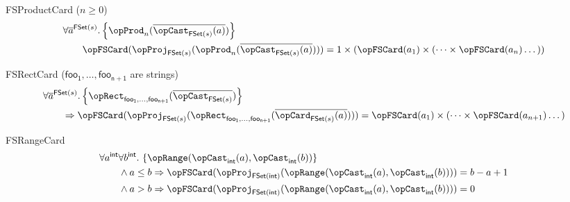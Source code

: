 \documentclass[11pt, a4paper, oneside]{article}
\begin{document}
\begin{axioms}
%

\item[FSProductCard ($n \ge 0$)] \[
        \begin{aligned}
            &\forall \overline{a}^{\FSet(s)}. \st{ \opProd_n(\overline{\opCast_{\FSet(s)}(a)}) } \\
            &\qquad \opFSCard(\opProj_{\FSet(s)}(\opProd_n(\overline{\opCast_{\FSet(s)}(a)}))) = 1 \times (\opFSCard(a_1) \times (\dots \times \opFSCard(a_n) \dots))
        \end{aligned}
    \]

\item[FSRectCard (\rm$\mathsf{foo_1},\dots,\mathsf{foo_{n+1}}$ are strings)] \[
        \begin{aligned}
            &\forall \overline{a}^{\FSet(s)}. \st{ \opRect_{\mathsf{foo_1}, \dots, \mathsf{foo_{n+1}}}(\overline{\opCast_{\FSet(s)}}) } \\
            &\qquad \imp \opFSCard(\opProj_{\FSet(s)}(\opRect_{\mathsf{foo_1}, \dots, \mathsf{foo_{n+1}}}(\overline{\opCard_{\FSet(s)}(a)}))) = \opFSCard(a_1) \times (\dots \times \opFSCard(a_{n+1}) \dots)
        \end{aligned}
    \]

\item[FSRangeCard] \[
        \begin{aligned}
            &\forall a^\int \forall b^\int.\, \st{ \opRange(\opCast_\int(a), \opCast_\int(b)) } \\
            &\qquad \begin{aligned}[t]
                &\wedge a \le b \imp \opFSCard(\opProj_{\FSet(\int)}(\opRange(\opCast_\int(a), \opCast_\int(b)))) = b - a + 1 \\
                &\wedge a > b \imp \opFSCard(\opProj_{\FSet(\int)}(\opRange(\opCast_\int(a), \opCast_\int(b)))) = 0
            \end{aligned}
        \end{aligned}
    \]

\end{axioms}
\end{document}
